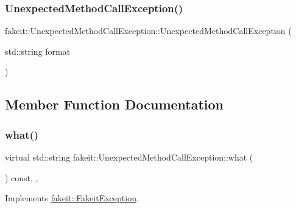 \subsubsection{\texorpdfstring{UnexpectedMethodCallException()}{UnexpectedMethodCallException()}\hspace{0.1cm}{\footnotesize\ttfamily [9/9]}}
{\footnotesize\ttfamily fakeit\+::\+Unexpected\+Method\+Call\+Exception\+::\+Unexpected\+Method\+Call\+Exception (\begin{DoxyParamCaption}\item[{std\+::string}]{format }\end{DoxyParamCaption})\hspace{0.3cm}{\ttfamily [inline]}}



\subsection{Member Function Documentation}
\mbox{\label{structfakeit_1_1UnexpectedMethodCallException_aabd833b1856e1cf842d2eafc3abf0a0e}} 
\subsubsection{\texorpdfstring{what()}{what()}\hspace{0.1cm}{\footnotesize\ttfamily [1/9]}}
{\footnotesize\ttfamily virtual std\+::string fakeit\+::\+Unexpected\+Method\+Call\+Exception\+::what (\begin{DoxyParamCaption}{ }\end{DoxyParamCaption}) const\hspace{0.3cm}{\ttfamily [inline]}, {\ttfamily [override]}, {\ttfamily [virtual]}}



Implements \mbox{\hyperlink{structfakeit_1_1FakeitException_a02ef6315b98e4382157c2106a62f7718}{fakeit\+::\+Fakeit\+Exception}}.

\mbox{\label{structfakeit_1_1UnexpectedMethodCallException_aabd833b1856e1cf842d2eafc3abf0a0e}} 
